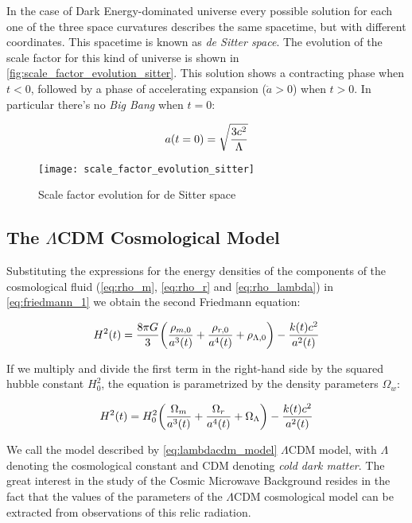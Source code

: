 In the case of Dark Energy-dominated universe every possible solution for
each one of the three space curvatures describes the same spacetime, but with
different coordinates. This spacetime is known as \emph{de Sitter space}.
The evolution of the scale factor for this kind of universe is shown in
\autoref{fig:scale_factor_evolution_sitter}. This solution shows a
contracting phase when $t < 0$, followed by a phase of accelerating
expansion ($\ddot a > 0$) when $t > 0$. In particular there's no
\emph{Big Bang} when $t = 0$:

\begin{equation}
        a\qty(t = 0) = \sqrt{\frac{3c^2}{\Lambda}}
\end{equation}

\begin{figure}
        \centering
        \texttt{[image: scale\_factor\_evolution\_sitter]}
        \caption{Scale factor evolution for de Sitter space}
        \label{fig:scale_factor_evolution_sitter}
\end{figure}

\subsection{The \texorpdfstring{$\Lambda$}{LAMBDA-}CDM Cosmological Model}

Substituting the expressions for the energy densities of the components of
the cosmological fluid (\autoref{eq:rho_m}, \autoref{eq:rho_r} and
\autoref{eq:rho_lambda}) in \autoref{eq:friedmann_1} we obtain the second
Friedmann equation:

\begin{equation}
        H^2\qty(t) = \frac{8\pi G}{3} \qty(\frac{\rho_{m,0}}{a^3\qty(t)} +
        \frac{\rho_{r,0}}{a^4\qty(t)} + \rho_{\Lambda,0}) -
        \frac{k\qty(t) c^2}{a^2\qty(t)}
\end{equation}

If we multiply and divide the first term in the right-hand side by the
squared hubble constant $H^2_0$, the equation is parametrized by the
density parameters $\Omega_w$:

\begin{equation}
        H^2\qty(t) = H^2_0 \qty(\frac{\Omega_m}{a^3\qty(t)} +
        \frac{\Omega_r}{a^4\qty(t)} + \Omega_\Lambda) -
        \frac{k\qty(t) c^2}{a^2\qty(t)}
        \label{eq:lambdacdm_model}
\end{equation}

We call the model described by \autoref{eq:lambdacdm_model} $\Lambda$CDM
model, with $\Lambda$ denoting the cosmological constant and CDM denoting
\emph{cold dark matter}. The great interest in the study of the Cosmic
Microwave Background resides in the fact that the values of the parameters
of the $\Lambda$CDM cosmological model can be extracted from observations
of this relic radiation.

